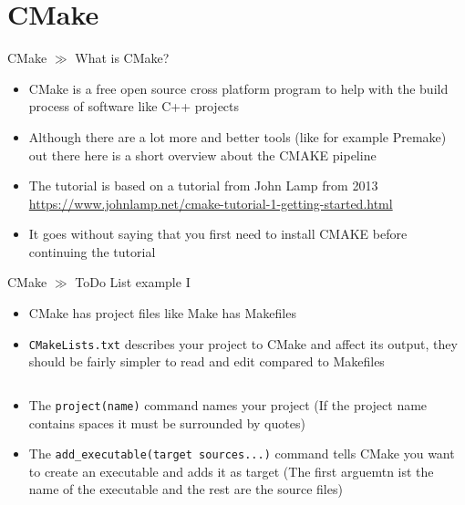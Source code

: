 \documentclass[10pt]{beamer}
\begin{document}
\section{CMake}

\begin{frame}{CMake $\gg$ What is CMake?}
\begin{itemize}
	\item CMake is a free open source cross platform program to help with the build process of software like C++ projects
	\item Although there are a lot more and better tools (like for example Premake) out there here is a short overview about the CMAKE pipeline
	\item The tutorial is based on a tutorial from John Lamp from 2013 \url{https://www.johnlamp.net/cmake-tutorial-1-getting-started.html}
	\item It goes without saying that you first need to install CMAKE before continuing the tutorial
\end{itemize}
\end{frame}

\begin{frame}{CMake $\gg$ ToDo List example I}
\begin{itemize}
	\item CMake has project files like Make has Makefiles
	\item \texttt{CMakeLists.txt} describes your project to CMake and affect its output, they should be fairly simpler to read and edit compared to Makefiles
	\inputminted[bgcolor=lightGreyCustom,fontsize=\scriptsize]{cmake}{./resources/CMake_ToDo_List/CMakeLists.txt}
	\item The \texttt{project(name)} command names your project (If the project name contains spaces it must be surrounded by quotes)
	\item The \texttt{add_executable(target sources...)} command tells CMake you want to create an executable and adds it as target (The first arguemtn ist the name of the executable and the rest are the source files)
\end{itemize}
\end{frame}
\end{document}

